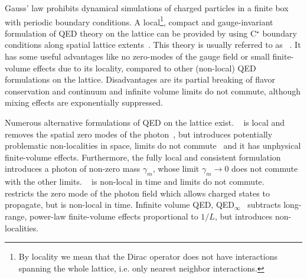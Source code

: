 Gauss' law prohibits dynamical simulations of charged particles in a finite box with periodic boundary conditions.
A local\footnote{By locality we mean that the Dirac operator does not have interactions spanning the whole lattice, i.e. only nearest neighbor interactions.}, compact and gauge-invariant formulation of QED theory on the lattice can be provided by using C$^{\star}$ boundary conditions along spatial lattice extents~\cite{cstar:Wiese1992,cstar:Polley1993,cstar:Kronfeld1991,cstar:Kronfeld1993}.
This theory is usually referred to as ~\cite{Lucini:2015}.
It has some useful advantages like no zero-modes of the gauge field or small finite-volume effects due to its locality, compared to other (non-local) QED formulations on the lattice.
Disadvantages are its partial breaking of flavor conservation and continuum and infinite volume limits do not commute, although mixing effects are exponentially suppressed.

Numerous alternative formulations of QED on the lattice exist.
~\cite{BMW:2014pzb,10.1143/PTP.120.413} is local and removes the spatial zero modes of the photon~\cite{Lucini:2015}, but introduces potentially problematic non-localities in space, limits do not commute~\cite{Patella:2017fgk} and it has unphysical finite-volume effects.
Furthermore, the fully local and consistent formulation ~\cite{PhysRevLett.117.072002} introduces a photon of non-zero mass $\gamma_m$, whose limit $\gamma_m \to 0$ does not commute with the other limits.
~\cite{Duncan:1996xy} is non-local in time and limits do not commute.
~\cite{Gockeler:1989wj} restricts the zero mode of the photon field which allows charged states to propagate, but is non-local in time.
Infinite volume QED, QED$_{\infty}$~\cite{Asmussen:2016lse,Blum:2017cer,RBC_2018,Feng:2018qpx} subtracts  long-range, power-law finite-volume effects proportional to $1/L$, but introduces non-localities.


